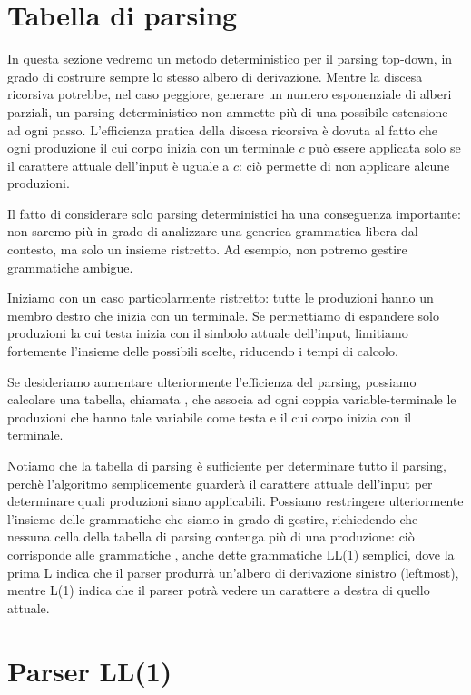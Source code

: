 \section{Tabella di parsing}
\label{sec:parser-sll}

In questa sezione vedremo un metodo deterministico per il parsing top-down, in grado di costruire sempre lo stesso
albero di derivazione.
Mentre la discesa ricorsiva potrebbe, nel caso peggiore, generare un numero esponenziale di alberi parziali, un parsing
deterministico non ammette più di una possibile estensione ad ogni passo.
L'efficienza pratica della discesa ricorsiva è dovuta al fatto che ogni produzione il cui corpo inizia con un
terminale $c$ può essere applicata solo se il carattere attuale dell'input è uguale a $c$: ciò permette di non applicare
alcune produzioni.

Il fatto di considerare solo parsing deterministici ha una conseguenza importante: non saremo più in grado di analizzare
una generica grammatica libera dal contesto, ma solo un insieme ristretto.
Ad esempio, non potremo gestire grammatiche ambigue.

Iniziamo con un caso particolarmente ristretto: tutte le produzioni hanno un membro destro che inizia con un terminale.
Se permettiamo di espandere solo produzioni la cui testa inizia con il simbolo attuale dell'input, limitiamo
fortemente l'insieme delle possibili scelte, riducendo i tempi di calcolo.

Se desideriamo aumentare ulteriormente l'efficienza del parsing, possiamo calcolare una tabella, chiamata
, che associa ad ogni coppia variable-terminale le produzioni che hanno tale variabile come
testa e il cui corpo inizia con il terminale.

Notiamo che la tabella di parsing è sufficiente per determinare tutto il parsing, perchè l'algoritmo semplicemente
guarderà il carattere attuale dell'input per determinare quali produzioni siano applicabili.
Possiamo restringere ulteriormente l'insieme delle grammatiche che siamo in grado di gestire, richiedendo che nessuna
cella della tabella di parsing contenga più di una produzione: ciò corrisponde alle grammatiche , anche
dette grammatiche LL(1) semplici, dove la prima L indica che il parser produrrà un'albero di derivazione sinistro
(leftmost), mentre L(1) indica che il parser potrà vedere un carattere a destra di quello attuale.

\section{Parser LL(1)}
\label{sec:parser-ll}

